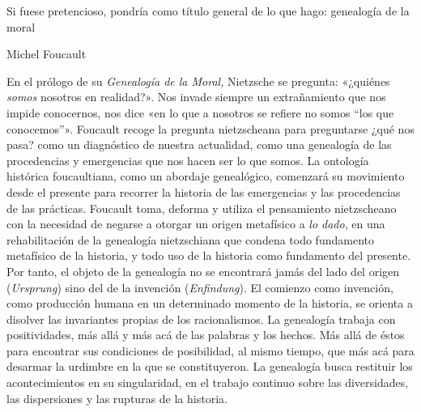 Si fuese pretencioso, pondría como título general de lo que hago: genealogía de la moral

Michel Foucault

En el prólogo de su \emph{Genealogía de la Moral, }Nietzsche se pregunta: «¿quiénes \emph{somos} nosotros en realidad?». Nos invade siempre un extrañamiento que nos impide conocernos, nos dice «en lo que a nosotros se refiere no somos ``los que conocemos''». Foucault recoge la pregunta nietzscheana para preguntarse ¿qué nos pasa? como un diagnóstico de nuestra actualidad, como una genealogía de las procedencias y emergencias que nos hacen ser lo que somos. La ontología histórica foucaultiana, como un abordaje genealógico, comenzará su movimiento desde el presente para recorrer la historia de las emergencias y las procedencias de las prácticas. Foucault toma, deforma y utiliza el pensamiento nietzscheano con la necesidad de negarse a otorgar un origen metafísico a \emph{lo dado}, en una rehabilitación de la genealogía nietzschiana que condena todo fundamento metafísico de la historia, y todo uso de la historia como fundamento del presente. Por tanto, el objeto de la genealogía no se encontrará jamás del lado del origen (\emph{Ursprung}) sino del de la invención (\emph{Enfindung}). El comienzo como invención, como producción humana en un determinado momento de la historia, se orienta a disolver las invariantes propias de los racionalismos. La genealogía trabaja con positividades, más allá y más acá de las palabras y los hechos. Más allá de éstos para encontrar sus condiciones de posibilidad, al mismo tiempo, que más acá para desarmar la urdimbre en la que se constituyeron. La genealogía busca restituir los acontecimientos en su singularidad, en el trabajo continuo sobre las diversidades, las dispersiones y las rupturas de la historia.

